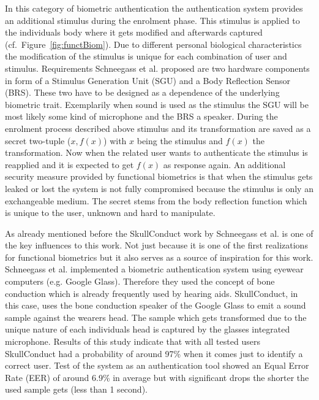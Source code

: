 In this category of biometric authentication the authentication system provides an additional stimulus during the enrolment phase.
This stimulus is applied to the individuals body where it gets modified and afterwards captured (cf.~Figure~\ref{fig:functBiom}).
Due to different personal biological characteristics the modification of the stimulus is unique for each combination of user and stimulus.
Requirements Schneegass et al. proposed are two hardware components in form of a Stimulus Generation Unit (SGU) and a Body Reflection Sensor (BRS).
These two have to be designed as a dependence of the underlying biometric trait. Exemplarily when sound is used as the stimulus the SGU will be most likely some kind of microphone and the BRS a speaker.
During the enrolment process described above stimulus and its transformation are saved as a secret two-tuple ($x, f(x)$) with $ x $ being the stimulus and $ f(x) $ the transformation.
Now when the related user wants to authenticate the stimulus is reapplied and it is expected to get $f(x)$ as response again.
An additional security measure provided by functional biometrics is that when the stimulus gets leaked or lost the system is not fully compromised because the stimulus is only an exchangeable medium.
The secret stems from the body reflection function which is unique to the user, unknown and hard to manipulate.


As already mentioned before the SkullConduct work by Schneegass et al. is one of the key influences to this work. Not just because it is one of the first realizations for functional biometrics but it also 
serves as a source of inspiration for this work.
Schneegass et al. implemented a biometric authentication system using eyewear computers (e.g. Google Glass).
Therefore they used the concept of bone conduction which is already frequently used by hearing aids. SkullConduct, in this case, uses the bone conduction speaker of the Google Glass to emit a sound sample against the wearers head.
The sample which gets transformed due to the unique nature of each individuals head is captured by the glasses integrated microphone.
Results of this study  indicate that with all tested users SkullConduct had a probability of around 97\% when it comes just to identify a correct user.
Test of the system as an authentication tool showed an Equal Error Rate (EER) of around 6.9\% in average but with significant drops the shorter the used sample gets (less than 1 second).

